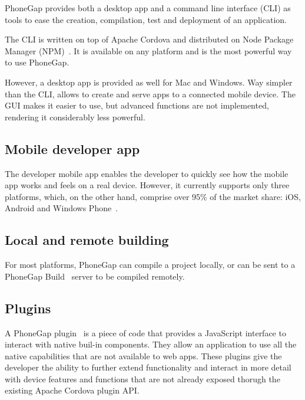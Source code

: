 PhoneGap provides both a desktop app and a command line interface (CLI) as tools to ease the creation, compilation, test and deployment of an application. 

The CLI is written on top of Apache Cordova and distributed on Node Package Manager (NPM)~\cite{npm}. It is available on any platform and is the most powerful way to use PhoneGap.

However, a desktop app is provided as well for Mac and Windows. Way simpler than the CLI, allows to create and serve apps to a connected mobile device. The GUI makes it easier to use, but advanced functions are not implemented, rendering it considerably less powerful.

\subsection{Mobile developer app}

The developer mobile app enables the developer to quickly see how the mobile app works and feels on a real device. However, it currently supports only three platforms, which, on the other hand, comprise over 95\% of the market share: iOS, Android and Windows Phone~\cite{3topmarketshare}.

\subsection{Local and remote building}

For most platforms, PhoneGap can compile a project locally, or can be sent to a PhoneGap  Build~\cite{phonegapbuild} server to be compiled remotely.

\subsection{Plugins}

A PhoneGap plugin~\cite{phonegapplugins} is a piece of code that provides a JavaScript interface to interact with native buil-in components. They allow an application to use all the native capabilities that are not available to web apps. These plugins give the developer the ability to further extend functionality and interact in more detail with device features and functions that are not already exposed thorugh the existing Apache Cordova plugin API.